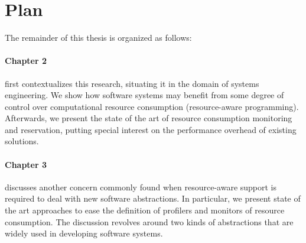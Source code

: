%
%
%
%


\section{Plan}

The remainder of this thesis is organized as follows:

\paragraph{Chapter 2} first contextualizes this research, situating it in the domain of systems engineering.
We show how software systems may benefit from some degree of control over computational resource consumption (resource-aware programming).
Afterwards, we present the state of the art of resource consumption monitoring and reservation, putting special interest on the performance overhead of existing solutions.

\paragraph{Chapter 3} discusses another concern commonly found when resource-aware support is required to deal with new software abstractions.
In particular, we present state of the art approaches to ease the definition of profilers and monitors of resource consumption.
The discussion revolves around two kinds of abstractions that are widely used in developing software systems.

